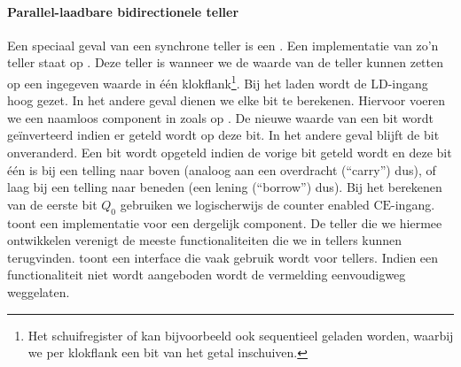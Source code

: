 \paragraph{Parallel-laadbare bidirectionele teller}
Een speciaal geval van een synchrone teller is een . Een implementatie van zo'n teller staat op . Deze teller is  wanneer we de waarde van de teller kunnen zetten op een ingegeven waarde in \'e\'en klokflank\footnote{Het schuifregister of  kan bijvoorbeeld ook sequentieel geladen worden, waarbij we per klokflank een bit van het getal inschuiven.}. Bij het laden wordt de $\mbox{LD}$-ingang hoog gezet. In het andere geval dienen we elke bit te berekenen. Hiervoor voeren we een naamloos component in zoals op . De nieuwe waarde van een bit wordt ge\"inverteerd indien er geteld wordt op deze bit. In het andere geval blijft de bit onveranderd. Een bit wordt opgeteld indien de vorige bit geteld wordt en deze bit \'e\'en is bij een telling naar boven (analoog aan een overdracht (``carry'') dus), of laag bij een telling naar beneden (een lening (``borrow'') dus). Bij het berekenen van de eerste bit $Q_0$ gebruiken we logischerwijs de counter enabled $\mbox{CE}$-ingang.  toont een implementatie voor een dergelijk component. De teller die we hiermee ontwikkelen verenigt de meeste functionaliteiten die we in tellers kunnen terugvinden.  toont een interface die vaak gebruik wordt voor tellers. Indien een functionaliteit niet wordt aangeboden wordt de vermelding eenvoudigweg weggelaten.

